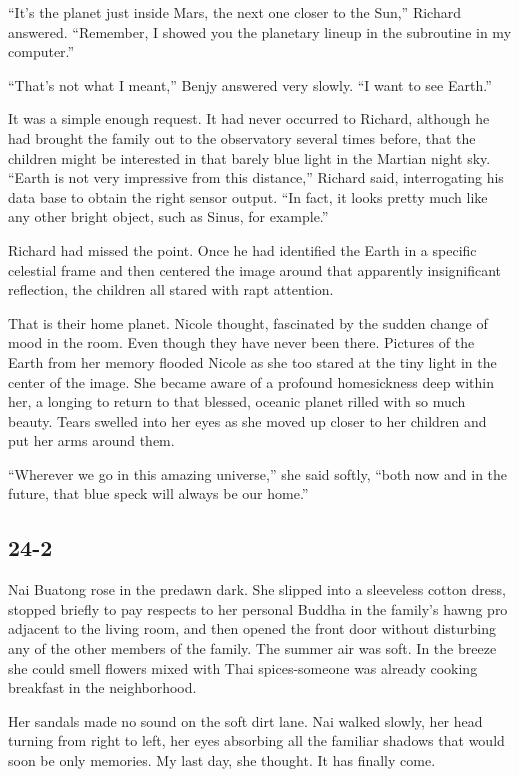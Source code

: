 \documentclass[]{article}
\begin{document}
{“It’s the planet just inside Mars, the next one closer to the Sun,” Richard answered.  “Remember, I showed you the planetary lineup in the subroutine in my computer.”

“That’s not what I meant,” Benjy answered very slowly.  “I want to see Earth.”

It was a simple enough request.  It had never occurred to Richard, although he had brought the family out to the observatory several times before, that the children might be interested in that barely blue light in the Martian night sky.  “Earth is not very impressive from this distance,” Richard said, interrogating his data base to obtain the right sensor output.  “In fact, it looks pretty much like any other bright object, such as Sinus, for example.”

Richard had missed the point.  Once he had identified the Earth in a specific celestial frame and then centered the image around that apparently insignificant reflection, the children all stared with rapt attention.

That is their home planet.  Nicole thought, fascinated by the sudden change of mood in the room.  Even though they have never been there.  Pictures of the Earth from her memory flooded Nicole as she too stared at the tiny light in the center of the image.  She became aware of a profound homesickness deep within her, a longing to return to that blessed, oceanic planet rilled with so much beauty.  Tears swelled into her eyes as she moved up closer to her children and put her arms around them.

“Wherever we go in this amazing universe,” she said softly, “both now and in the future, that blue speck will always be our home.”


\subsection*{24-2}

Nai Buatong rose in the predawn dark.  She slipped into a sleeveless cotton dress, stopped briefly to pay respects to her personal Buddha in the family’s hawng pro adjacent to the living room, and then opened the front door without disturbing any of the other members of the family.  The summer air was soft.  In the breeze she could smell flowers mixed with Thai spices-someone was already cooking breakfast in the neighborhood.

Her sandals made no sound on the soft dirt lane.  Nai walked slowly, her head turning from right to left, her eyes absorbing all the familiar shadows that would soon be only memories.  My last day, she thought.  It has finally come.

}
\end{document}
